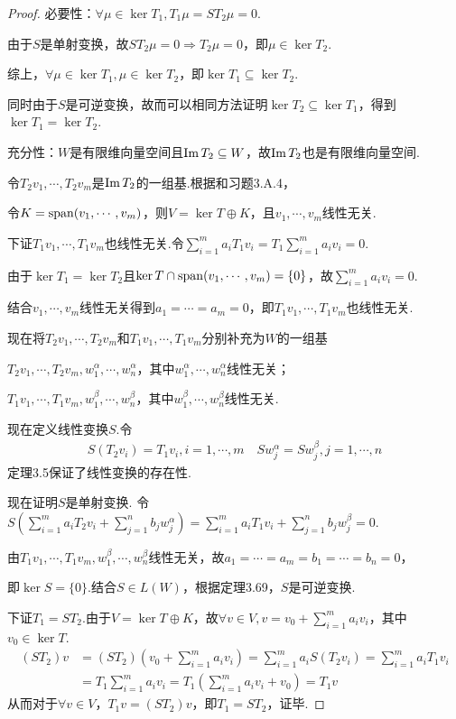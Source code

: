 \begin{proof}
    必要性：\(\forall \mu \in \ker T_1,T_1 \mu=ST_2 \mu =0\).

    由于\(S\)是单射变换，故\(ST_2 \mu =0 \Rightarrow T_2 \mu =0\)，即\(\mu \in \ker T_2\).
    
    综上，\(\forall \mu \in \ker T_1, \mu \in \ker T_2\)，即\(\ker T_1 \subseteq \ker T_2\).
    
    同时由于\(S\)是可逆变换，故而可以相同方法证明\(\ker T_2 \subseteq \ker T_1\)，得到\(\ker T_1=\ker T_2\).
    
    充分性：\(W\)是有限维向量空间且\(\operatorname{Im} T_2 \subseteq W\)，故\(\operatorname{Im} T_2\)也是有限维向量空间.
    
    令\(T_2v_1,\cdots,T_2v_m\)是\(\operatorname{Im} T_2\)的一组基.根据和习题3.A.4，
    
    令\(K=\operatorname{span} (v_1,\cdots,v_m)\)，则\(V=\ker T \oplus K\)，且\(v_1,\cdots,v_m\)线性无关.
    
    下证\(T_1v_1,\cdots,T_1v_m\)也线性无关.令\(\sum_{i=1}^m a_iT_1v_i=T_1\sum_{i=1}^m a_iv_i=0\).
    
    由于\(\ker T_1=\ker T_2\)且\(\ker T \cap \operatorname{span} (v_1,\cdots,v_m)=\{0\}\)，故\(\sum_{i=1}^m a_iv_i=0\).
    
    结合\(v_1,\cdots,v_m\)线性无关得到\(a_1=\cdots=a_m=0\)，即\(T_1v_1,\cdots,T_1v_m\)也线性无关.
    
    现在将\(T_2v_1,\cdots,T_2v_m\)和\(T_1v_1,\cdots,T_1v_m\)分别补充为\(W\)的一组基
    
    \(T_2v_1,\cdots,T_2v_m,w_1^\alpha,\cdots,w_n^\alpha\)，其中\(w_1^\alpha,\cdots,w_n^\alpha\)线性无关；
    
    \(T_1v_1,\cdots,T_1v_m,w_1^\beta,\cdots,w_n^\beta\)，其中\(w_1^\beta,\cdots,w_n^\beta\)线性无关.
    
    现在定义线性变换\(S\).令
    \begin{align*}
        S(T_2v_i)=T_1v_i,i=1,\cdots,m \quad Sw_j^\alpha=Sw_j^\beta,j=1,\cdots,n
    \end{align*}
    定理3.5保证了线性变换的存在性.
    
    现在证明\(S\)是单射变换.
    令\(S(\sum_{i=1}^m a_iT_2v_i+\sum_{j=1}^n b_jw_j^\alpha)=\sum_{i=1}^m a_iT_1v_i+\sum_{j=1}^n b_jw_j^\beta=0\).
    
    由\(T_1v_1,\cdots,T_1v_m,w_1^\beta,\cdots,w_n^\beta\)线性无关，故\(a_1=\cdots=a_m=b_1=\cdots=b_n=0\)，
    
    即\(\ker S=\{0\}\).结合\(S \in L(W)\)，根据定理3.69，\(S\)是可逆变换.
    
    下证\(T_1=ST_2\).由于\(V=\ker T \oplus K\)，故\(\forall v \in V,v=v_0+\sum_{i=1}^m a_iv_i\)，其中\(v_0 \in \ker T\).
    \begin{align*}
        (ST_2)v&=(ST_2)(v_0+\sum_{i=1}^m a_iv_i)=\sum_{i=1}^m a_iS(T_2v_i)=\sum_{i=1}^m a_iT_1v_i \\
            &=T_1\sum_{i=1}^m a_iv_i=T_1(\sum_{i=1}^m a_iv_i+v_0)=T_1v
    \end{align*}
    从而对于\(\forall v \in V\)，\(T_1v=(ST_2)v\)，即\(T_1=ST_2\)，证毕.    
\end{proof}

